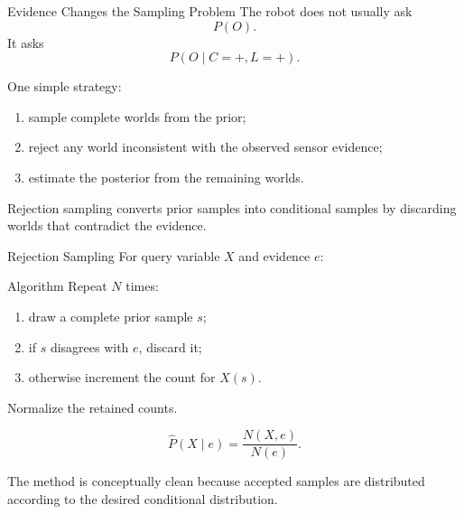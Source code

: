 \documentclass[aspectratio=169,10pt]{beamer}
\begin{document}
\begin{frame}[shrink=10]{Evidence Changes the Sampling Problem}
  The robot does not usually ask
  \[
    P(O).
  \]
  It asks
  \[
    P(O\mid C=+,L=+).
  \]

  One simple strategy:
  \begin{enumerate}
    \item sample complete worlds from the prior;
    \item reject any world inconsistent with the observed sensor evidence;
    \item estimate the posterior from the remaining worlds.
  \end{enumerate}

  \begin{keyidea}
    Rejection sampling converts prior samples into conditional samples by discarding worlds that contradict the evidence.
  \end{keyidea}
\end{frame}

\begin{frame}[shrink=10]{Rejection Sampling}
  For query variable $X$ and evidence $e$:

  \begin{block}{Algorithm}
    Repeat $N$ times:
    \begin{enumerate}
      \item draw a complete prior sample $s$;
      \item if $s$ disagrees with $e$, discard it;
      \item otherwise increment the count for $X(s)$.
    \end{enumerate}
    Normalize the retained counts.
  \end{block}

  \[
    \widehat{P}(X\mid e)
    =
    \frac{N(X,e)}{N(e)}.
  \]

  \begin{keyidea}
    The method is conceptually clean because accepted samples are distributed according to the desired conditional distribution.
  \end{keyidea}
\end{frame}
\end{document}

